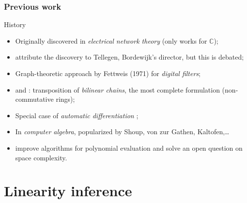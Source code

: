 \documentclass[10pt]{beamer}
\newcommand{\C}{\mathbb{C}}
\begin{document}

\begin{frame}
  \frametitle{Previous work}

  \begin{block}{History}
    \begin{itemize}
    \item Originally discovered in \emph{electrical network theory}
      \cite{Bor56} (only works for $\C$);
    \item \cite{BCS} attribute the discovery to Tellegen, Bordewijk's
      director, but this is debated;
    \item Graph-theoretic approach by Fettweis (1971) for
      \emph{digital filters};
    \item \cite{Fid73} and \cite{HoMu73}: transposition of
      \emph{bilinear chains}, the most complete formulation
      (non-commutative rings);
    \item Special case of \emph{automatic differentiation}
      \cite{BS83};
    \item In \emph{computer algebra}, popularized by Shoup, von zur
      Gathen, Kaltofen,\dots
    \item \cite{BLS03} improve algorithms for polynomial evaluation
      and solve an open question on space complexity.
    \end{itemize}
  \end{block}
\end{frame}


\section{Linearity inference}
\end{document}
